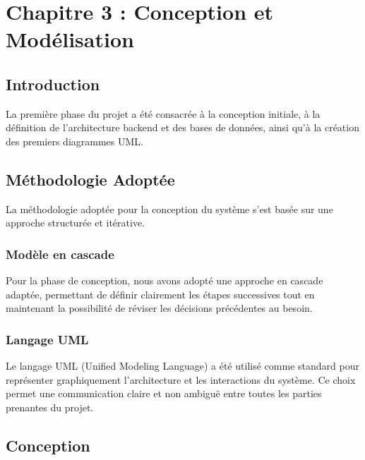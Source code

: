 \chapter{Chapitre 3 : Conception et Modélisation}
\thispagestyle{fancy}
\newpage

\section{Introduction}
La première phase du projet a été consacrée à la conception initiale, à la définition de l'architecture backend et des bases de données, ainsi qu'à la création des premiers diagrammes UML.

\section{Méthodologie Adoptée}
La méthodologie adoptée pour la conception du système s'est basée sur une approche structurée et itérative.

\subsection{Modèle en cascade}
Pour la phase de conception, nous avons adopté une approche en cascade adaptée, permettant de définir clairement les étapes successives tout en maintenant la possibilité de réviser les décisions précédentes au besoin.

\subsection{Langage UML}
Le langage UML (Unified Modeling Language) a été utilisé comme standard pour représenter graphiquement l'architecture et les interactions du système. Ce choix permet une communication claire et non ambiguë entre toutes les parties prenantes du projet.

\section{Conception}

